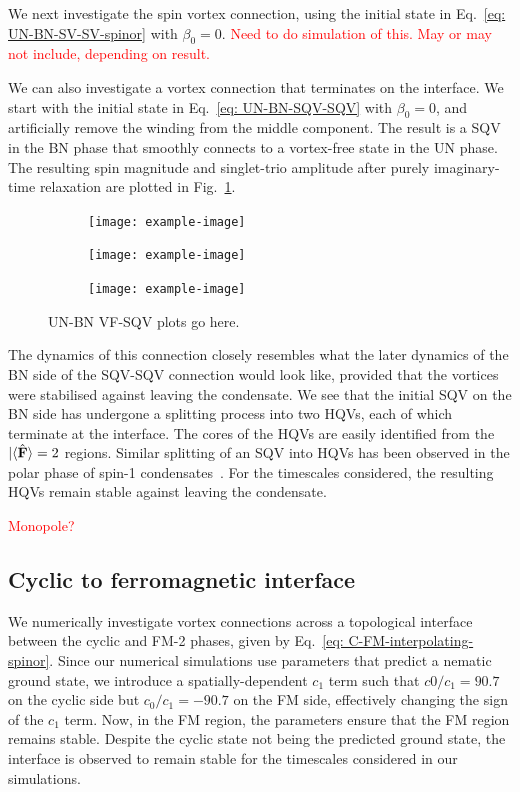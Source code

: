 We next investigate the spin vortex connection, using the initial state in
Eq.~\eqref{eq: UN-BN-SV-SV-spinor} with \(\beta_0=0\).
\textcolor{red}{Need to do simulation of this. May or may not include,
    depending on result.}

We can also investigate a vortex connection that terminates on the interface.
We start with the initial state in Eq.~\eqref{eq: UN-BN-SQV-SQV} with
\(\beta_0=0\), and artificially remove the winding from the middle component.
The result is a SQV in the BN phase that smoothly connects to a vortex-free
state in the UN phase.
The resulting spin magnitude and singlet-trio amplitude after purely
imaginary-time relaxation are plotted in Fig.~\ref{fig: UN-BN-VF-SQV}.
\begin{figure}
    \centering
    \begin{subfigure}{0.33\textwidth}
        \texttt{[image: example-image]}
        \caption{}
    \end{subfigure}
    \begin{subfigure}{0.33\textwidth}
        \texttt{[image: example-image]}
        \caption{}
    \end{subfigure}
    \begin{subfigure}{0.33\textwidth}
        \texttt{[image: example-image]}
        \caption{}
    \end{subfigure}
    \caption{\label{fig: UN-BN-VF-SQV} UN-BN VF-SQV plots go here.}
\end{figure}
The dynamics of this connection closely resembles what the later dynamics of the
BN side of the SQV-SQV connection would look like, provided that the vortices
were stabilised against leaving the condensate.
We see that the initial SQV on the BN side has undergone a splitting process
into two HQVs, each of which terminate at the interface.
The cores of the HQVs are easily identified from the
\(|\langle \hat{\vb{F}} \rangle = 2\) regions.
Similar splitting of an SQV into HQVs has been observed in the polar phase of
spin-1 condensates~\cite{Seo2015, Xiao2021}.
For the timescales considered, the resulting HQVs remain stable against
leaving the condensate.

\textcolor{red}{Monopole?}

\subsection{Cyclic to ferromagnetic interface}
We numerically investigate vortex connections across a topological interface
between the cyclic and FM-2 phases, given by
Eq.~\eqref{eq: C-FM-interpolating-spinor}.
Since our numerical simulations use parameters that predict a nematic ground
state, we introduce a spatially-dependent \(c_1\) term such that \(c0/c_1=90.7\)
on the cyclic side but \(c_0/c_1=-90.7\) on the FM side, effectively changing
the sign of the \(c_1\) term.
Now, in the FM region, the parameters ensure that the FM region remains stable.
Despite the cyclic state not being the predicted ground state, the interface
is observed to remain stable for the timescales considered in our simulations.

